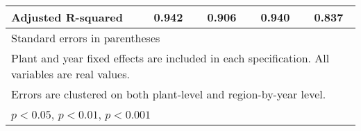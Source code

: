 \begin{table}[htbp]
\begin{tabular}{l*{4}{c}}
Adjusted R-squared&    0.942         &    0.906         &    0.940         &    0.837         \\
\bottomrule
\multicolumn{5}{l}{\footnotesize Standard errors in parentheses}\\
\multicolumn{5}{l}{\footnotesize Plant and year fixed effects are included in each specification. All variables are real values.}\\
\multicolumn{5}{l}{\footnotesize Errors are clustered on both plant-level and region-by-year level. }\\
\multicolumn{5}{l}{\footnotesize \sym{*} \(p<0.05\), \sym{**} \(p<0.01\), \sym{***} \(p<0.001\)}\\
\end{tabular}
\end{table}
